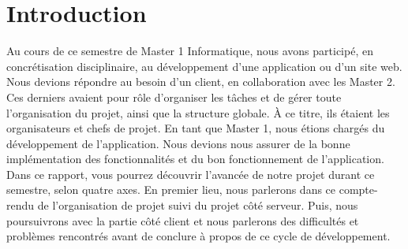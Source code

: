 \chapter*{Introduction}

Au cours de ce semestre de Master 1 Informatique, nous avons participé, en concrétisation disciplinaire, au développement d'une application ou d'un site web. Nous devions répondre au besoin d'un client, en collaboration avec les Master 2. Ces derniers avaient pour rôle d'organiser les tâches et de gérer toute l'organisation du projet, ainsi que la structure globale. À ce titre, ils étaient les organisateurs et chefs de projet.
En tant que Master 1, nous étions chargés du développement de l'application. Nous devions nous assurer de la bonne implémentation des fonctionnalités et du bon fonctionnement de l'application.
Dans ce rapport, vous pourrez découvrir l'avancée de notre projet durant ce semestre, selon quatre axes. En premier lieu, nous parlerons dans ce compte-rendu de l'organisation de projet suivi du projet côté serveur. Puis, nous poursuivrons avec la partie côté client et nous parlerons des difficultés et problèmes rencontrés avant de conclure à propos de ce cycle de développement.


